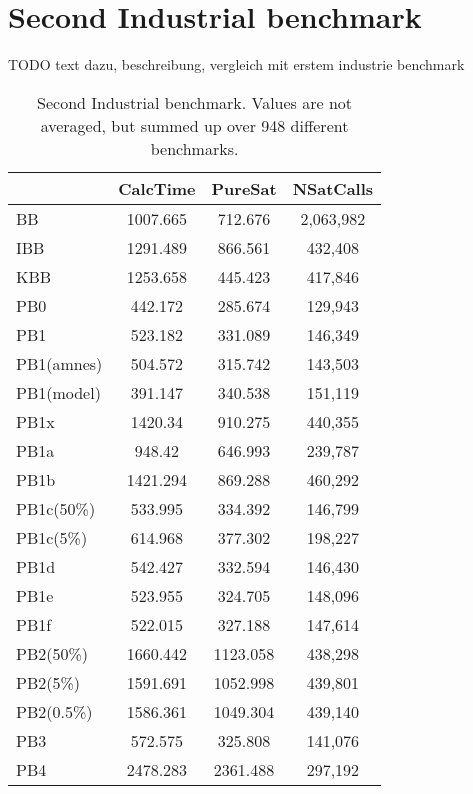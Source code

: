 \section{Second Industrial benchmark}

TODO text dazu, beschreibung, vergleich mit erstem industrie benchmark

\begin{wraptable}{R}{8cm}
\begin{tabular}{l| c c c }

 & CalcTime & PureSat & NSatCalls \\
 \hline
BB & 1007.665 & 712.676 & 2,063,982 \\
IBB & 1291.489 & 866.561 & 432,408 \\
KBB & 1253.658 & 445.423 & 417,846 \\
PB0 & 442.172 & 285.674 & 129,943 \\
PB1 & 523.182 & 331.089 & 146,349 \\
PB1(amnes) & 504.572 & 315.742 & 143,503 \\
PB1(model) & 391.147 & 340.538 & 151,119 \\
PB1x & 1420.34 & 910.275 & 440,355 \\
PB1a & 948.42 & 646.993 & 239,787 \\
PB1b & 1421.294 & 869.288 & 460,292 \\
PB1c(50\%) & 533.995 & 334.392 & 146,799 \\
PB1c(5\%) & 614.968 & 377.302 & 198,227 \\
PB1d & 542.427 & 332.594 & 146,430 \\
PB1e & 523.955 & 324.705 & 148,096 \\
PB1f & 522.015 & 327.188 & 147,614 \\
PB2(50\%) & 1660.442 & 1123.058 & 438,298 \\
PB2(5\%) & 1591.691 & 1052.998 & 439,801 \\
PB2(0.5\%) & 1586.361 & 1049.304 & 439,140 \\
PB3 & 572.575 & 325.808 & 141,076 \\
PB4 & 2478.283 & 2361.488 & 297,192 \\

\end{tabular}
\caption{Second Industrial benchmark. Values are not averaged, but summed up over 948 different benchmarks.}
\label{tab:vonThore2pof} %
\end{wraptable}

